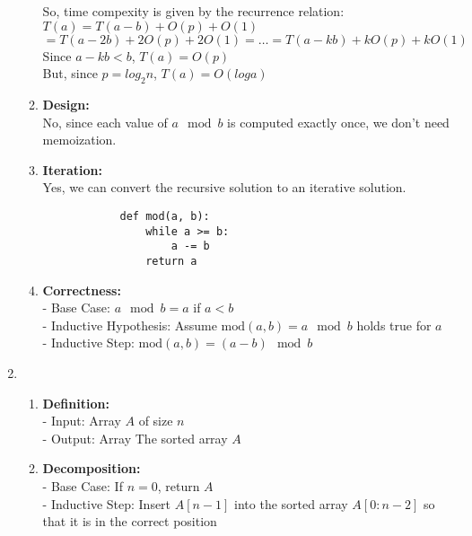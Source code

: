 \documentclass[a4paper]{article}
\begin{document}
\begin{enumerate}
\begin{enumerate}
        So, time compexity is given by the recurrence relation:\\
        $T(a) = T(a-b) + O(p) + O(1)$ \\
        $ = T(a-2b) + 2O(p) + 2O(1) = \dots = T(a - kb) + kO(p) + kO(1)$ \\
        Since $a - kb < b$, $T(a) = O(p)$ \\
        But, since $p = log_2 n$, $T(a) = O(loga)$ \\

        \item \textbf{Design:} \\
        No, since each value of $a \mod b$ is computed exactly once, we don't need memoization. \\

        \item \textbf{Iteration:} \\
        Yes, we can convert the recursive solution to an iterative solution.
        \lstset{language=Python}
        \begin{lstlisting}
            def mod(a, b):
                while a >= b:
                    a -= b
                return a
        \end{lstlisting}

        \item \textbf{Correctness:} \\
        - Base Case: $a \mod b = a$ if $a < b$ \\
        - Inductive Hypothesis: Assume $\text{mod}(a, b) = a \mod b$ holds true for $a$ \\
        - Inductive Step: $\text{mod}(a, b) = (a - b) \mod b$
    \end{enumerate}

    \item \begin{enumerate}
        \item \textbf{Definition:} \\
        - Input: Array $A$ of size $n$ \\
        - Output: Array The sorted array $A$ \\

        \item \textbf{Decomposition:} \\
        - Base Case: If $n = 0$, return $A$ \\
        - Inductive Step: Insert $A[n-1]$ into the sorted array $A[0:n-2]$ so that it is in the correct position \\
        

\end{enumerate}
\end{enumerate}
\end{document}
